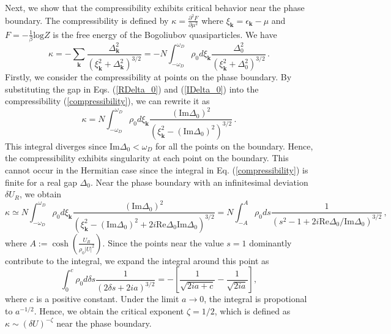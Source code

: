 \documentclass[aps,onecolumn,nofootinbib,superscriptaddress,notitlepage,longbibliography]{revtex4-1}
\begin{document}
Next, we show that the compressibility exhibits critical behavior near the phase boundary. The compressibility is defined by $\kappa=\frac{\partial^2F}{\partial\mu^2}$ where $\xi_{\bm{k}}=\epsilon_{\bm{k}}-\mu$ and $F=-\frac{1}{\beta}\text{log}Z$ is the free energy of the Bogoliubov quasiparticles. We have
\begin{equation}
  \kappa = - \sum_{\bm{k}} \frac{\Delta_{\bm{k}}^2}{(\xi_{\bm{k}}^2 +
  \Delta_{\bm{k}}^2)^{3 / 2}} = - N\int_{- \omega_D}^{\omega_D} \rho_0 d
  \xi_{\bm{k}} \frac{\Delta_0^2}{(\xi_{\bm{k}}^2 + \Delta_0^2)^{3
  / 2}}\,.
  \label{compressibility}
\end{equation}
Firstly, we consider the compressibility at points on the phase boundary. By substituting the gap in Eqs. (\ref{RDelta_0}) and (\ref{IDelta_0}) into the compressibility (\ref{compressibility}), we can rewrite it as
\begin{equation}
  \kappa= N\int_{- \omega_D}^{\omega_D} \rho_0 d \xi_{\bm{k}}
  \frac{(\text{Im} \Delta_0)^2}{(\xi_{\bm{k}}^2 - (\text{Im}
  \Delta_0)^2)^{3 / 2}}\,.
\end{equation}
This integral diverges since $\text{Im} \Delta_0 < \omega_D$ for all the points on the boundary. Hence, the compressibility exhibits singularity at each point on the boundary. This cannot occur in the Hermitian case since the integral in Eq. (\ref{compressibility}) is finite for a real gap $\Delta_0$. Near the phase boundary with an infinitesimal deviation $\delta U_R$, we obtain
\begin{equation}
	\kappa\simeq N\int_{- \omega_D}^{\omega_D} \rho_0 d \xi_{\bm{k}}
  \frac{(\text{Im} \Delta_0)^2}{(\xi_{\bm{k}}^2 - (\text{Im} \Delta_0)^2
  + 2 i \text{Re} \Delta_0 \text{Im} \Delta_0)^{3 / 2}} = N\int_{- A}^A \rho_0
  ds \frac{1}{(s^2 - 1 + 2 i \text{Re}
  \Delta_0 / \text{Im} \Delta_0)^{3 / 2}}\,,
\end{equation}
where $A := \cosh \left( \frac{U_R}{\rho_0 | U |^2} \right)$. Since the points near the value $s = 1$ dominantly contribute to the integral, we expand the integral around this point as
\begin{equation}
  \int_{0}^{c} \rho_0 d \delta s \frac{1}{(2 \delta
  s+ 2 i a)^{3 / 2}}=-[\frac{1}{\sqrt{2ia+c}}-\frac{1}{\sqrt{2ia}}],
\end{equation}
where $c$ is a positive constant. Under the limit $a\to0$, the integral is propotional to $a^{-1/2}$. Hence, we obtain the critical exponent $\zeta = 1 / 2$, which is defined as $\kappa \sim (\delta U)^{- \zeta}$ near the phase boundary.
\end{document}
